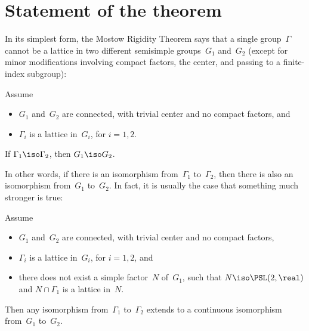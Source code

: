 
\label{MostowChap}




\section{Statement of the theorem}

In its simplest form, the Mostow Rigidity Theorem says that a single group~$\Gamma$ cannot be a lattice in two different semisimple groups~$G_1$ and~$G_2$ (except for  minor modifications involving compact factors, the center, and passing to a finite-index subgroup):

\begin{thm} \label{MostowIso}
Assume
\noprelistbreak
	\begin{itemize}
	\item $G_1$ and~$G_2$ are connected, with trivial center and no compact factors,
	and
	\item $\Gamma_i$ is a lattice in~$G_i$, for $i = 1,2$.
	\end{itemize}
If\/ $\Gamma_1 \iso \Gamma_2$, then $G_1 \iso G_2$.
\end{thm}

In other words, if there is an isomorphism from~$\Gamma_1$ to~$\Gamma_2$, then there is also an isomorphism from~$G_1$ to~$G_2$. In fact, it is usually the case that something much stronger is true: 

\begin{namedthm}
\label{MostowRigidity}
Assume
\noprelistbreak
	\begin{itemize}
	\item $G_1$ and~$G_2$ are connected, with trivial center and no compact factors,
	\item $\Gamma_i$ is a lattice in~$G_i$, for $i = 1,2$,
	and
	\item there does not exist a simple factor~$N$ of~$G_1$, such that $N \iso \PSL(2,\real)$ and $N \cap \Gamma_1$ is a lattice in~$N$.
	\end{itemize}
Then any isomorphism from~$\Gamma_1$ to~$\Gamma_2$ extends
to a continuous isomorphism from~$G_1$ to~$G_2$.
 \end{namedthm}


